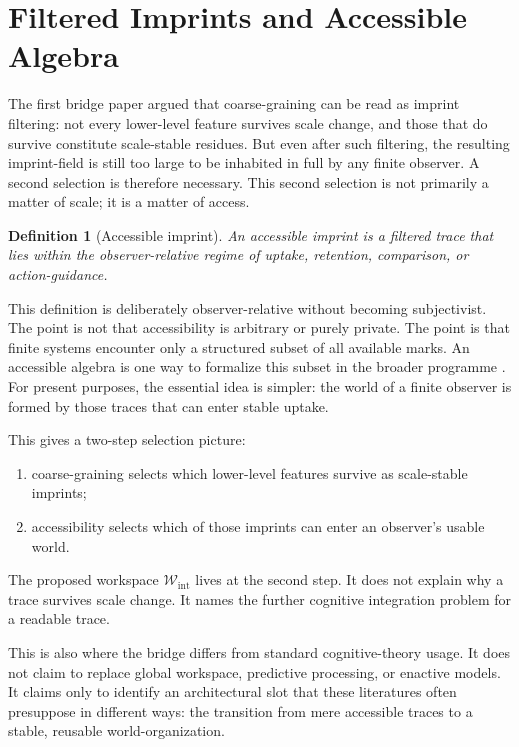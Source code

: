 \documentclass[12pt,a4paper]{article}
\newtheorem{definition}{Definition}[section]
\begin{document}
\section{Filtered Imprints and Accessible Algebra}

The first bridge paper argued that coarse-graining can be read as imprint filtering: not every lower-level feature survives scale change, and those that do survive constitute scale-stable residues. But even after such filtering, the resulting imprint-field is still too large to be inhabited in full by any finite observer. A second selection is therefore necessary. This second selection is not primarily a matter of scale; it is a matter of access.

\begin{definition}[Accessible imprint]
An \emph{accessible imprint} is a filtered trace that lies within the observer-relative regime of uptake, retention, comparison, or action-guidance.
\end{definition}

This definition is deliberately observer-relative without becoming subjectivist. The point is not that accessibility is arbitrary or purely private. The point is that finite systems encounter only a structured subset of all available marks. An accessible algebra is one way to formalize this subset in the broader programme \cite{FoundationI,FoundationII}. For present purposes, the essential idea is simpler: the world of a finite observer is formed by those traces that can enter stable uptake.

This gives a two-step selection picture:

\begin{enumerate}
\item coarse-graining selects which lower-level features survive as scale-stable imprints;
\item accessibility selects which of those imprints can enter an observer's usable world.
\end{enumerate}

The proposed workspace \(\mathcal W_{\mathrm{int}}\) lives at the
second step. It does not explain why a trace survives scale change. It
names the further cognitive integration problem for a readable trace.

This is also where the bridge differs from standard cognitive-theory usage. It does not claim to replace global workspace, predictive processing, or enactive models. It claims only to identify an architectural slot that these literatures often presuppose in different ways: the transition from mere accessible traces to a stable, reusable world-organization.
\end{document}
